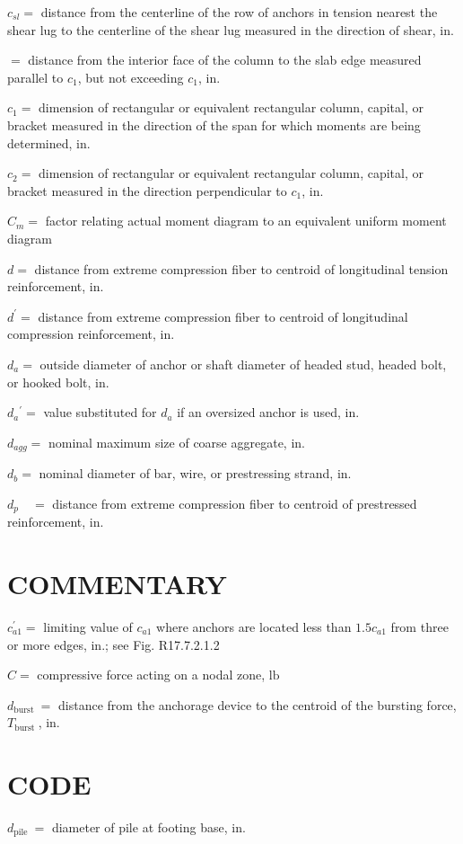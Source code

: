 \documentclass[10pt]{article}
\begin{document}
$c_{s l}=$ distance from the centerline of the row of anchors in tension nearest the shear lug to the centerline of the shear lug measured in the direction of shear, in.

$=$ distance from the interior face of the column to the slab edge measured parallel to $c_{1}$, but not exceeding $c_{1}$, in.

$c_{1}=$ dimension of rectangular or equivalent rectangular column, capital, or bracket measured in the direction of the span for which moments are being determined, in.

$c_{2}=$ dimension of rectangular or equivalent rectangular column, capital, or bracket measured in the direction perpendicular to $c_{1}$, in.

$C_{m}=$ factor relating actual moment diagram to an equivalent uniform moment diagram

$d=$ distance from extreme compression fiber to centroid of longitudinal tension reinforcement, in.

$d^{\prime}=$ distance from extreme compression fiber to centroid of longitudinal compression reinforcement, in.

$d_{a}=$ outside diameter of anchor or shaft diameter of headed stud, headed bolt, or hooked bolt, in.

$d_{a}{ }^{\prime}=$ value substituted for $d_{a}$ if an oversized anchor is used, in.

$d_{a g g}=$ nominal maximum size of coarse aggregate, in.

$d_{b}=$ nominal diameter of bar, wire, or prestressing strand, in.

$d_{p} \quad=$ distance from extreme compression fiber to centroid of prestressed reinforcement, in.

\section*{COMMENTARY}
$c_{a 1}^{\prime}=$ limiting value of $c_{a 1}$ where anchors are located less than $1.5 c_{a 1}$ from three or more edges, in.; see Fig. R17.7.2.1.2

$C=$ compressive force acting on a nodal zone, $\mathrm{lb}$

$d_{\text {burst }}=$ distance from the anchorage device to the centroid of the bursting force, $T_{\text {burst }}$, in.

\section*{CODE}
$d_{\text {pile }}=$ diameter of pile at footing base, in.
\end{document}
